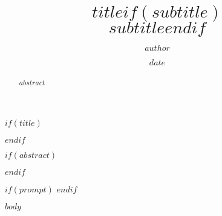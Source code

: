 \documentclass[12pt,paper=letter]{article}
\title{$title$$if(subtitle)$\\\large{$subtitle$}$endif$}
\author{$author$}
\date{$date$}
\begin{document}
    $if(title)$
    \maketitle
    $endif$

    $if(abstract)$
    \begin{abstract}
        $abstract$
    \end{abstract}
    $endif$

    $if(prompt)$
    $endif$

    $body$
\end{document}

